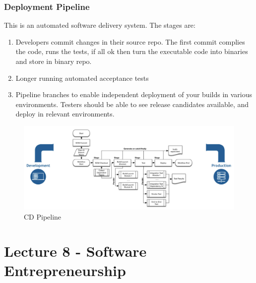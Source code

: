 \documentclass{article}
\begin{document}
\subsubsection{Deployment Pipeline}
This is an automated software delivery system. The stages are:
\begin{enumerate}
    \item Developers commit changes in their source repo. The first commit complies the code, runs the tests, if all ok then turn the executable code into binaries and store in binary repo.
    \item Longer running automated acceptance tests
    \item Pipeline branches to enable independent deployment of your builds in various environments. Testers should be able to see release candidates available, and deploy in relevant environments. 
\end{enumerate}
\begin{figure}[H]
    \centering
    \includegraphics[width = 0.8\linewidth]{Pictures/Screenshot 2023-02-11 at 16.30.40.png}
    \caption{CD Pipeline}
\end{figure}
\section{Lecture 8 - Software Entrepreneurship}
\end{document}
